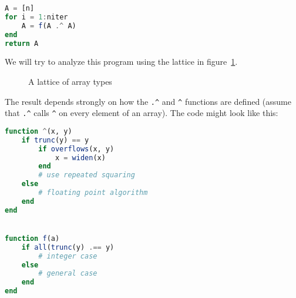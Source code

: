 \begin{singlespace}
\begin{lstlisting}[language=julia]
A = [n]
for i = 1:niter
    A = f(A .^ A)
end
return A
\end{lstlisting}
\end{singlespace}

\noindent
We will try to analyze this program using the lattice in figure~\ref{fig:arraylattice}.

\begin{figure}[!t]
\begin{center}
\end{center}
\caption{
  A lattice of array types
}
\label{fig:arraylattice}
\end{figure}

The result depends strongly on how the \texttt{.\^} and \texttt{\^} functions
are defined (assume that \texttt{.\^} calls \texttt{\^} on every element of an array).
The code might look like this:

\vspace{-4ex}
\begin{singlespace}
\begin{multicols}{2}
\begin{lstlisting}[language=julia]
function ^(x, y)
    if trunc(y) == y
        if overflows(x, y)
            x = widen(x)
        end
        # use repeated squaring
    else
        # floating point algorithm
    end
end


function f(a)
    if all(trunc(y) .== y)
        # integer case
    else
        # general case
    end
end
\end{lstlisting}
\end{multicols}
\end{singlespace}


